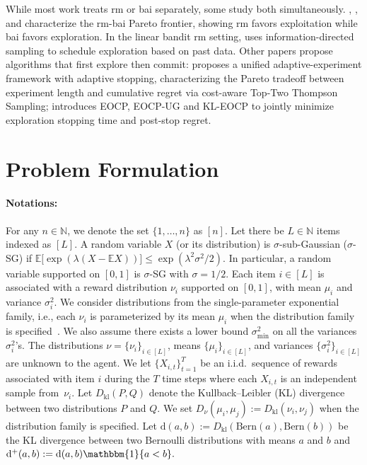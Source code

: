 \documentclass[twoside,11pt]{article}
\newcommand{\kl}{D_{\mathrm{kl}}}
\newcommand{\rmd}{\mathrm{d}}
\newcommand{\bbE}{\mathbb{E}}
\newcommand{\Ber}{\mathrm{Bern}}
\newcommand{\klnu}{D_{\nu}}
\begin{document}
While most work treats \ac{rm} or \ac{bai}  separately, some study both simultaneously. \citet{degenne2019bridging}, \citet{zhong2023achieving}, and \citet{yang2026} characterize the \ac{rm}-\ac{bai} Pareto frontier, showing \ac{rm}  favors exploitation while \ac{bai} favors exploration. In the  linear bandit \ac{rm} setting, \citet{kirschner2021asymptotically} uses information-directed sampling to schedule exploration based on past data. Other papers propose algorithms that first explore then commit: \citet{qin2024optimizing} proposes a unified adaptive-experiment framework with adaptive stopping, characterizing the Pareto tradeoff between experiment length and cumulative regret via cost-aware Top-Two Thompson Sampling; \citet{zhang2023fast} introduces EOCP, EOCP-UG and KL-EOCP to jointly minimize exploration stopping time and post-stop regret.
\section{Problem Formulation}\label{sec:prob_form}
\paragraph{Notations:} For any $n \in \mathbb{N}$, we denote the set $\{1, \ldots , n\}$ as $[n]$. Let there be $L \in \mathbb{N}$ items indexed as $[L]$.
A random variable $X $ (or its distribution) is $\sigma$-sub-Gaussian  ($\sigma$-SG) if
$\mathbb{E}\big[ \exp( \lambda (X -\bbE X)) \big] \leq \exp( {\lambda^{2} \sigma^{2}}/{2}).$
In particular, a random variable supported on $[0,1]$ is $\sigma$-SG with $\sigma=1/2$.
Each item $i \in [L]$ is associated with a
reward distribution $\nu_i$ supported on $[0,1]$, with
mean $\mu_i$ and variance $\sigma_i^2$. We consider distributions from the single-parameter exponential family, i.e., each $\nu_i$ is parameterized by its mean $\mu_i$ when the distribution family is specified~\citep{garivier2016optimal}. 
We also assume there exists a lower bound $\sigma_{\min}^2$ on all the  variances $\sigma^2_i$'s.
The distributions
$\nu=\{\nu_i  \}_{i\in[L]}$, means $\{\mu_i   \}_{i\in[L]}$, and variances $\{\sigma_i^2   \}_{i\in[L]}$ are unknown to the agent.  
We let $\{ X_{i,t}  \}_{t=1}^T$ be an i.i.d.\ sequence of rewards associated with item $i$ during the $T$ time steps where
each $X_{i,t}$ is an independent sample from~$\nu_i$. 
Let $\kl(P,Q)$ denote the Kullback--Leibler (KL) divergence between two distributions $P$ and $Q$. We set $\klnu(\mu_i,\mu_j):=\kl(\nu_i,\nu_j)$ when the distribution family is specified. Let
$\rmd(a,b):=\kl(\Ber(a),\Ber(b))$ be the KL  divergence between two Bernoulli distributions with means $a$ and $b$ and $\rmd^+(a,b):=\rmd(a,b)\mathbbm{1}\{a<b\}.$
\end{document}
